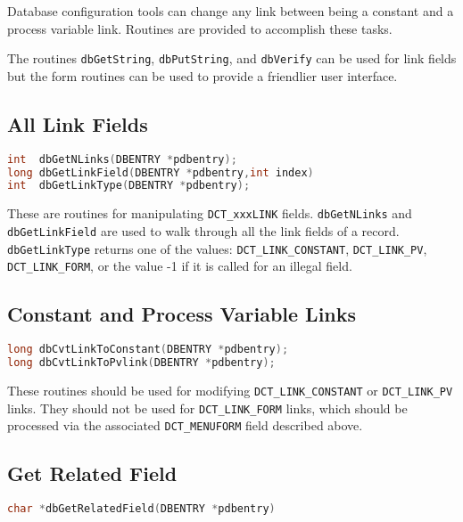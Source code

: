 Database configuration tools can change any link between being a constant and a process variable link.
Routines are provided to accomplish these tasks.

The routines \verb|dbGetString|, \verb|dbPutString|, and \verb|dbVerify| can be used for link fields but the form routines can be used to provide a friendlier user interface.

\subsection{All Link Fields}

\begin{lstlisting}[language=C]
int  dbGetNLinks(DBENTRY *pdbentry);
long dbGetLinkField(DBENTRY *pdbentry,int index)
int  dbGetLinkType(DBENTRY *pdbentry);
\end{lstlisting}

These are routines for manipulating \verb|DCT_xxxLINK| fields. \verb|dbGetNLinks| and \verb|dbGetLinkField| are used to walk 
through all the link fields of a record. \verb|dbGetLinkType| returns one of the values: \verb|DCT_LINK_CONSTANT|, 
\verb|DCT_LINK_PV|, \verb|DCT_LINK_FORM|, or the value -1 if it is called for an illegal field.

\subsection{Constant and Process Variable Links}

\begin{lstlisting}[language=C]
long dbCvtLinkToConstant(DBENTRY *pdbentry);
long dbCvtLinkToPvlink(DBENTRY *pdbentry);
\end{lstlisting}

These routines should be used for modifying \verb|DCT_LINK_CONSTANT| or \verb|DCT_LINK_PV| links. They should not be used 
for \verb|DCT_LINK_FORM| links, which should be processed via the associated \verb|DCT_MENUFORM| field described above.

\subsection{Get Related Field}

\begin{lstlisting}[language=C]
char *dbGetRelatedField(DBENTRY *pdbentry)
\end{lstlisting}

